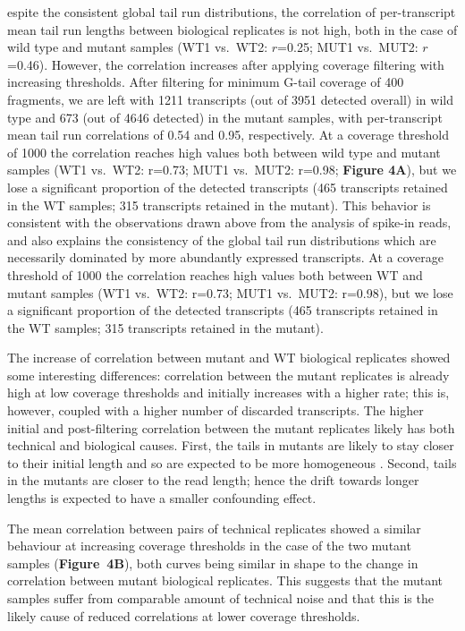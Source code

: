 \documentclass[10pt]{article}
\begin{document}
espite the consistent global tail run distributions, the correlation of per-transcript mean tail run lengths between biological replicates is not high, both in the case of wild type and mutant samples (WT1 vs.\ WT2: $r$=0.25; MUT1 vs.\ MUT2: $r$=0.46).
However, the correlation increases after applying coverage filtering with increasing thresholds. After filtering for minimum G-tail coverage of 400 fragments, we are left with 1211 transcripts (out of 3951 detected overall) in wild type and 673 (out of 4646 detected) in the mutant samples, with per-transcript mean tail run correlations of 0.54 and 0.95, respectively.
At a coverage threshold of 1000 the correlation reaches high values both between wild type and mutant samples (WT1 vs.\ WT2: r=0.73; MUT1 vs.\ MUT2: r=0.98; \textbf{Figure 4A}), but we lose a significant proportion of the detected transcripts (465 transcripts retained in the WT samples; 315 transcripts retained in the mutant). 
This behavior is consistent with the observations drawn above from the analysis of spike-in reads, and also explains the consistency of the global tail run distributions which are necessarily dominated by more abundantly expressed transcripts.
At a coverage threshold of 1000 the correlation reaches high values both between WT and mutant samples (WT1 vs.\ WT2: r=0.73; MUT1 vs.\ MUT2: r=0.98), but we lose a significant proportion of the detected transcripts (465 transcripts retained in the WT samples; 315 transcripts retained in the mutant).

The increase of correlation between mutant and WT biological replicates showed some interesting differences: correlation between the mutant replicates is already high at low coverage thresholds and initially increases with a higher rate; this is, however, coupled with a higher number of discarded transcripts. The higher initial and post-filtering correlation between the mutant replicates likely has both technical and biological causes. First, the tails in mutants are likely to stay closer to their initial length and so are expected to be more homogeneous \cite{traven05,beilharz07}. Second, tails in the mutants are closer to the read length; hence the drift towards longer lengths is expected to have a smaller confounding effect.

The mean correlation between pairs of technical replicates showed a similar behaviour at increasing coverage thresholds in the case of the two mutant samples (\textbf{Figure~4B}), both curves being similar in shape to the change in correlation between mutant biological replicates. This suggests that the mutant samples suffer from comparable amount of technical noise and that this is the likely cause of reduced correlations at lower coverage thresholds.
\end{document}
